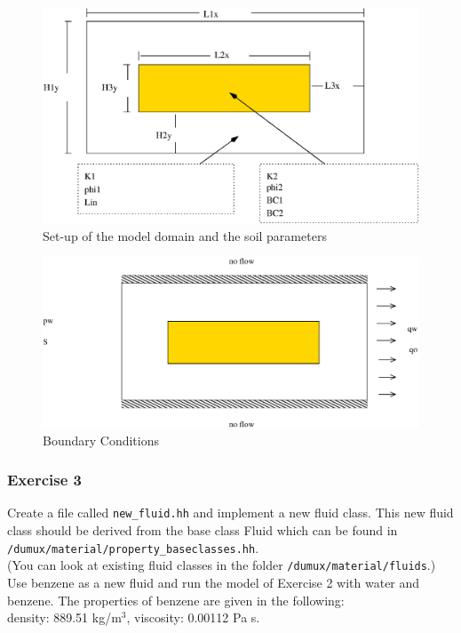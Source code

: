 \begin{figure}[h]
\centering
\includegraphics[width=0.8\linewidth,keepaspectratio]{EPS/Ex2_Domain.eps}
\caption{Set-up of the model domain and the soil parameters}\label{tutorial-deoucpled:ex2_Domain}
\end{figure}

\begin{figure}[h]
\centering
\includegraphics[width=0.8\linewidth,keepaspectratio]{EPS/Ex2_Boundary.eps}
\caption{Boundary Conditions}\label{tutorial-deoucpled:ex2_BC}
\end{figure}

\subsubsection{Exercise 3}
Create a file called \texttt{new\_fluid.hh} and implement a new fluid class. This new fluid class should be derived from the base class Fluid which can be found in  \texttt{/dumux/material/property\_baseclasses.hh}. \\
(You can look at existing fluid classes in the folder \texttt{/dumux/material/fluids}.)
Use benzene as a new fluid and run the model of Exercise 2 with water and benzene. The properties of benzene are given in the following: \\
density: 889.51 kg/$\text{m}^3$, viscosity: 0.00112 Pa s. 
